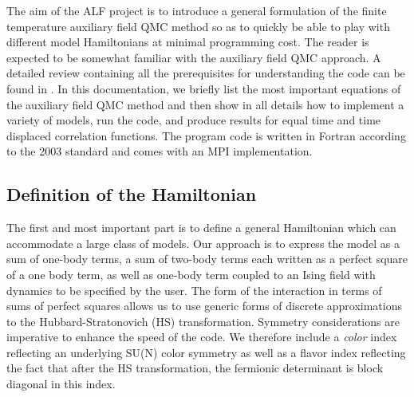 The aim of the ALF project is to introduce a general formulation of the finite temperature  auxiliary field QMC method  so as to quickly be able to play with different model Hamiltonians  at  minimal programming cost.      
The reader is expected to be somewhat familiar with the auxiliary field QMC  approach. A detailed review containing all  the prerequisites for understanding  the code can be found in \cite{Assaad08_rev}.    
In this documentation, we briefly list the most important equations of the auxiliary field QMC method and then show in all details how to implement a variety of models, run the code, and produce  results for  equal time and time displaced correlation functions. 
The program code is written in Fortran according to the 2003 standard and  comes with an MPI implementation.  


\subsection{Definition of the Hamiltonian}

The first and most important  part is to define a general Hamiltonian which  can  accommodate a large class of models. 
Our approach is to express the model as a sum of one-body terms, a sum of two-body terms each written as a perfect square of a one body term, as well as one-body  term  coupled to an Ising field with  dynamics to be specified by the user. 
The form of the interaction in terms of sums of perfect squares allows us to use generic forms of  discrete  approximations to the  Hubbard-Stratonovich (HS)  transformation. 
Symmetry considerations  are  imperative to enhance the speed of the code.  
We therefore include a \textit{color} index  reflecting  an underlying  SU(N) color symmetry as  well as a flavor index  reflecting  the fact that  after  the HS  transformation,  the  fermionic determinant is block diagonal in this index.

